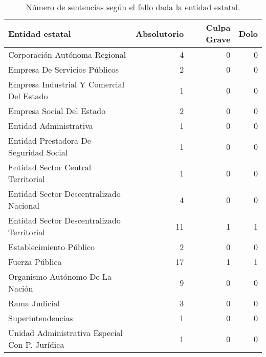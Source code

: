 \begin{table}[!htbp]
\centering
\caption{Número de sentencias según el fallo dada la entidad estatal.} 
\label{tab:entidadfallo}
\begin{tabular}{lrrr}
  \hline
Entidad estatal & Absolutorio & Culpa Grave & Dolo \\ 
  \hline
Corporación Autónoma Regional &  4 &  0 &  0 \\ 
  Empresa De Servicios Públicos &  2 &  0 &  0 \\ 
  Empresa Industrial Y Comercial Del Estado &  1 &  0 &  0 \\ 
  Empresa Social Del Estado &  2 &  0 &  0 \\ 
  Entidad Administrativa &  1 &  0 &  0 \\ 
  Entidad Prestadora De Seguridad Social &  1 &  0 &  0 \\ 
  Entidad Sector Central Territorial &  1 &  0 &  0 \\ 
  Entidad Sector Descentralizado Nacional &  4 &  0 &  0 \\ 
  Entidad Sector Descentralizado Territorial & 11 &  1 &  1 \\ 
  Establecimiento Público &  2 &  0 &  0 \\ 
  Fuerza Pública & 17 &  1 &  1 \\ 
  Organismo Autónomo De La Nación &  9 &  0 &  0 \\ 
  Rama Judicial &  3 &  0 &  0 \\ 
  Superintendencias &  1 &  0 &  0 \\ 
  Unidad Administrativa Especial Con P. Jurídica &  1 &  0 &  0 \\ 
   \hline
\end{tabular}
\end{table}
